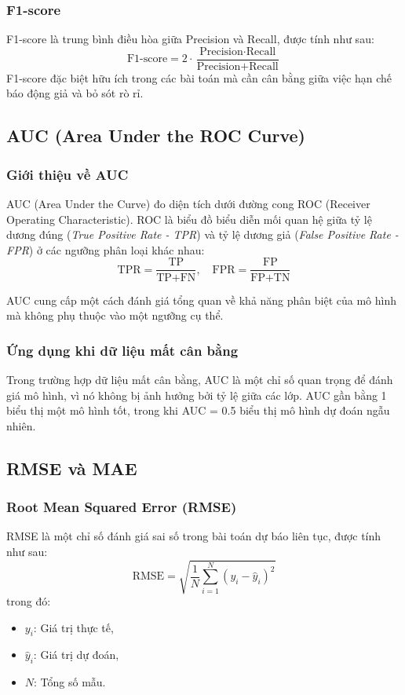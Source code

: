 \subsubsection{F1-score}
F1-score là trung bình điều hòa giữa Precision và Recall, được tính như sau:
\[
\text{F1-score} = 2 \cdot \frac{\text{Precision} \cdot \text{Recall}}{\text{Precision} + \text{Recall}}
\]
F1-score đặc biệt hữu ích trong các bài toán mà cần cân bằng giữa việc hạn chế báo động giả và bỏ sót rò rỉ.

\subsection{AUC (Area Under the ROC Curve)}
\subsubsection{Giới thiệu về AUC}
AUC (Area Under the Curve) đo diện tích dưới đường cong ROC (Receiver Operating Characteristic). ROC là biểu đồ biểu diễn mối quan hệ giữa tỷ lệ dương đúng (\textit{True Positive Rate - TPR}) và tỷ lệ dương giả (\textit{False Positive Rate - FPR}) ở các ngưỡng phân loại khác nhau:
\[
\text{TPR} = \frac{\text{TP}}{\text{TP} + \text{FN}}, \quad \text{FPR} = \frac{\text{FP}}{\text{FP} + \text{TN}}
\]

AUC cung cấp một cách đánh giá tổng quan về khả năng phân biệt của mô hình mà không phụ thuộc vào một ngưỡng cụ thể.

\subsubsection{Ứng dụng khi dữ liệu mất cân bằng}
Trong trường hợp dữ liệu mất cân bằng, AUC là một chỉ số quan trọng để đánh giá mô hình, vì nó không bị ảnh hưởng bởi tỷ lệ giữa các lớp. AUC gần bằng 1 biểu thị một mô hình tốt, trong khi AUC = 0.5 biểu thị mô hình dự đoán ngẫu nhiên.

\subsection{RMSE và MAE}
\subsubsection{Root Mean Squared Error (RMSE)}
RMSE là một chỉ số đánh giá sai số trong bài toán dự báo liên tục, được tính như sau:
\[
\text{RMSE} = \sqrt{\frac{1}{N} \sum_{i=1}^N (y_i - \hat{y}_i)^2}
\]
trong đó:
\begin{itemize}
    \item \(y_i\): Giá trị thực tế,
    \item \(\hat{y}_i\): Giá trị dự đoán,
    \item \(N\): Tổng số mẫu.
\end{itemize}

